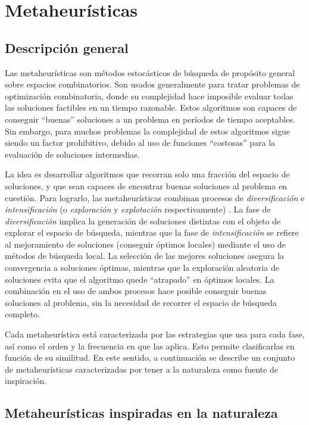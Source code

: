 \chapter{Metaheurísticas}
\label{capitulo2}

\section{Descripción general}

Las metaheurísticas son métodos estocásticos de búsqueda de propósito general sobre espacios combinatorios. Son usados generalmente para tratar problemas de optimización combinatoria, donde su complejidad hace imposible evaluar todas las soluciones factibles en un tiempo razonable. Estos algoritmos son capaces de conseguir ``buenas'' soluciones a un problema en períodos de tiempo aceptables. Sin embargo, para muchos problemas la complejidad de estos algoritmos sigue siendo un factor prohibitivo, debido al uso de funciones ``costosas'' para la evaluación de soluciones intermedias.

La idea es desarrollar algoritmos que recorran solo una fracción del espacio de soluciones, y que sean capaces de encontrar buenas soluciones al problema en cuestión. Para lograrlo, las metaheurísticas combinan procesos de \emph{diversificación} e \emph{intensificación} (o \emph{exploración} y \emph{explotación} respectivamente) \cite{Yang:2008:NMA:1628847}. La fase de \emph{diversificación} implica la generación de soluciones distintas con el objeto de explorar el espacio de búsqueda, mientras que la fase de \emph{intensificación} se refiere al mejoramiento de soluciones (conseguir óptimos locales) mediante el uso de métodos de búsqueda local. La selección de las mejores soluciones asegura la convergencia a soluciones óptimas, mientras que la exploración aleatoria de soluciones evita que el algoritmo quede ``atrapado'' en óptimos locales. La combinación en el uso de ambos procesos hace posible conseguir buenas soluciones al problema, sin la necesidad de recorrer el espacio de búsqueda completo.

Cada metaheurística está caracterizada por las estrategias que usa para cada fase, así como el orden y la frecuencia en que las aplica. Esto permite clasificarlas en función de su similitud. En este sentido, a continuación se describe un conjunto de metaheurísticas caracterizadas por tener a la naturaleza como fuente de inspiración.

\section{Metaheurísticas inspiradas en la naturaleza}

